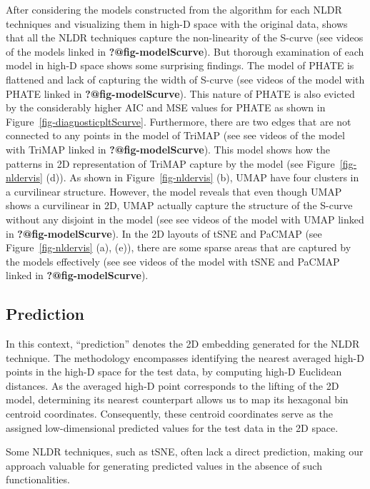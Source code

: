 \documentclass[
  12pt]{article}
\begin{document}
After considering the models constructed from the algorithm for each
NLDR techniques and visualizing them in high-D space with the original
data, shows that all the NLDR techniques capture the non-linearity of
the S-curve (see videos of the models linked in
\textbf{?@fig-modelScurve}). But thorough examination of each model in
high-D space shows some surprising findings. The model of PHATE is
flattened and lack of capturing the width of S-curve (see videos of the
model with PHATE linked in \textbf{?@fig-modelScurve}). This nature of
PHATE is also evicted by the considerably higher AIC and MSE values for
PHATE as shown in Figure~\ref{fig-diagnosticpltScurve}. Furthermore,
there are two edges that are not connected to any points in the model of
TriMAP (see see videos of the model with TriMAP linked in
\textbf{?@fig-modelScurve}). This model shows how the patterns in 2D
representation of TriMAP capture by the model (see
Figure~\ref{fig-nldervis} (d)). As shown in Figure~\ref{fig-nldervis}
(b), UMAP have four clusters in a curvilinear structure. However, the
model reveals that even though UMAP shows a curvilinear in 2D, UMAP
actually capture the structure of the S-curve without any disjoint in
the model (see see videos of the model with UMAP linked in
\textbf{?@fig-modelScurve}). In the 2D layouts of tSNE and PaCMAP (see
Figure~\ref{fig-nldervis} (a), (e)), there are some sparse areas that
are captured by the models effectively (see see videos of the model with
tSNE and PaCMAP linked in \textbf{?@fig-modelScurve}).

\hypertarget{sec-prediction}{%
\subsection{Prediction}\label{sec-prediction}}

In this context, ``prediction'' denotes the 2D embedding generated for
the NLDR technique. The methodology encompasses identifying the nearest
averaged high-D points in the high-D space for the test data, by
computing high-D Euclidean distances. As the averaged high-D point
corresponds to the lifting of the 2D model, determining its nearest
counterpart allows us to map its hexagonal bin centroid coordinates.
Consequently, these centroid coordinates serve as the assigned
low-dimensional predicted values for the test data in the 2D space.

Some NLDR techniques, such as tSNE, often lack a direct prediction,
making our approach valuable for generating predicted values in the
absence of such functionalities.
\end{document}
